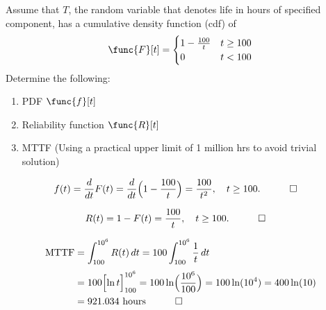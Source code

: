 \begin{hwkProblem}{5}{}

	Assume that \( T \), the random variable that denotes life in hours of specified component, has a cumulative density function (cdf) of
	\[
		\func{F}[t] = \begin{cases}
			1 - \frac{100}{t} & t \geq 100 \\
			0 & t < 100
		\end{cases}
	\]
	Determine the following:
	\begin{enumerate}
		\item PDF \( \func{f}[t] \)
		\item Reliability function \( \func{R}[t] \)
		\item MTTF (Using a practical upper limit of 1 million hrs to avoid trivial solution)
	\end{enumerate}

	\hwkSol

	\hwkPart
	\begin{align*}
		f(t)&=\frac{d}{dt}F(t)=\frac{d}{dt}\Bigl(1-\frac{100}{t}\Bigr)
		=\frac{100}{t^2},\quad t\ge100. \quad \qed
	\end{align*}

	\hwkPart
	\begin{align*}
		R(t)&=1-F(t)=\frac{100}{t},\quad t\ge100. \quad \qed
	\end{align*}

	\hwkPart
	\begin{align*}
		\text{MTTF}&=\int_{100}^{10^6}R(t)\,dt
		= 100\int_{100}^{10^6}\frac{1}{t}\,dt\\[1mm]
			   &= 100\Bigl[\ln t\Bigr]_{100}^{10^6}
			   = 100\ln\Bigl(\frac{10^6}{100}\Bigr)
			   = 100\ln(10^4)
			   = 400\ln(10) \\
			   &=921.034 \text{ hours} \quad \qed
	\end{align*}

\end{hwkProblem}

